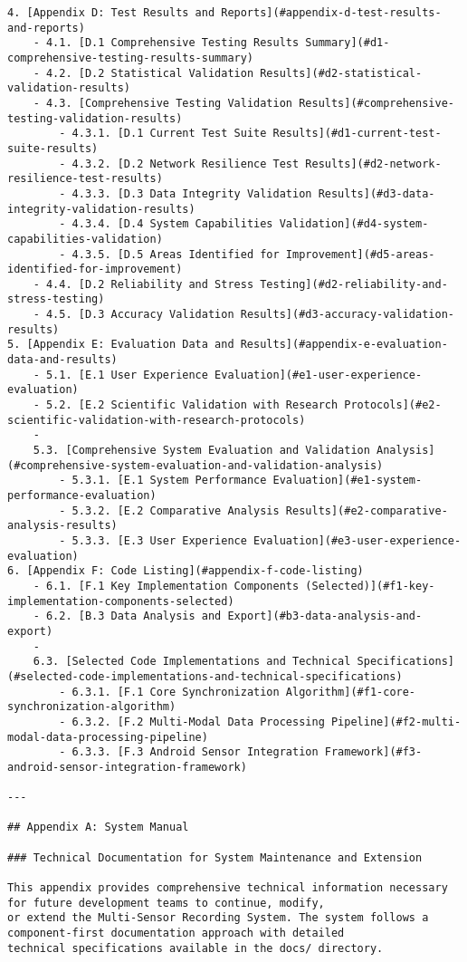 \documentclass[12pt,a4paper]{report}
\begin{document}
\begin{verbatim}
4. [Appendix D: Test Results and Reports](#appendix-d-test-results-and-reports)
    - 4.1. [D.1 Comprehensive Testing Results Summary](#d1-comprehensive-testing-results-summary)
    - 4.2. [D.2 Statistical Validation Results](#d2-statistical-validation-results)
    - 4.3. [Comprehensive Testing Validation Results](#comprehensive-testing-validation-results)
        - 4.3.1. [D.1 Current Test Suite Results](#d1-current-test-suite-results)
        - 4.3.2. [D.2 Network Resilience Test Results](#d2-network-resilience-test-results)
        - 4.3.3. [D.3 Data Integrity Validation Results](#d3-data-integrity-validation-results)
        - 4.3.4. [D.4 System Capabilities Validation](#d4-system-capabilities-validation)
        - 4.3.5. [D.5 Areas Identified for Improvement](#d5-areas-identified-for-improvement)
    - 4.4. [D.2 Reliability and Stress Testing](#d2-reliability-and-stress-testing)
    - 4.5. [D.3 Accuracy Validation Results](#d3-accuracy-validation-results)
5. [Appendix E: Evaluation Data and Results](#appendix-e-evaluation-data-and-results)
    - 5.1. [E.1 User Experience Evaluation](#e1-user-experience-evaluation)
    - 5.2. [E.2 Scientific Validation with Research Protocols](#e2-scientific-validation-with-research-protocols)
    -
    5.3. [Comprehensive System Evaluation and Validation Analysis](#comprehensive-system-evaluation-and-validation-analysis)
        - 5.3.1. [E.1 System Performance Evaluation](#e1-system-performance-evaluation)
        - 5.3.2. [E.2 Comparative Analysis Results](#e2-comparative-analysis-results)
        - 5.3.3. [E.3 User Experience Evaluation](#e3-user-experience-evaluation)
6. [Appendix F: Code Listing](#appendix-f-code-listing)
    - 6.1. [F.1 Key Implementation Components (Selected)](#f1-key-implementation-components-selected)
    - 6.2. [B.3 Data Analysis and Export](#b3-data-analysis-and-export)
    -
    6.3. [Selected Code Implementations and Technical Specifications](#selected-code-implementations-and-technical-specifications)
        - 6.3.1. [F.1 Core Synchronization Algorithm](#f1-core-synchronization-algorithm)
        - 6.3.2. [F.2 Multi-Modal Data Processing Pipeline](#f2-multi-modal-data-processing-pipeline)
        - 6.3.3. [F.3 Android Sensor Integration Framework](#f3-android-sensor-integration-framework)

---

## Appendix A: System Manual

### Technical Documentation for System Maintenance and Extension

This appendix provides comprehensive technical information necessary for future development teams to continue, modify,
or extend the Multi-Sensor Recording System. The system follows a component-first documentation approach with detailed
technical specifications available in the docs/ directory.


\end{verbatim}
\end{document}
